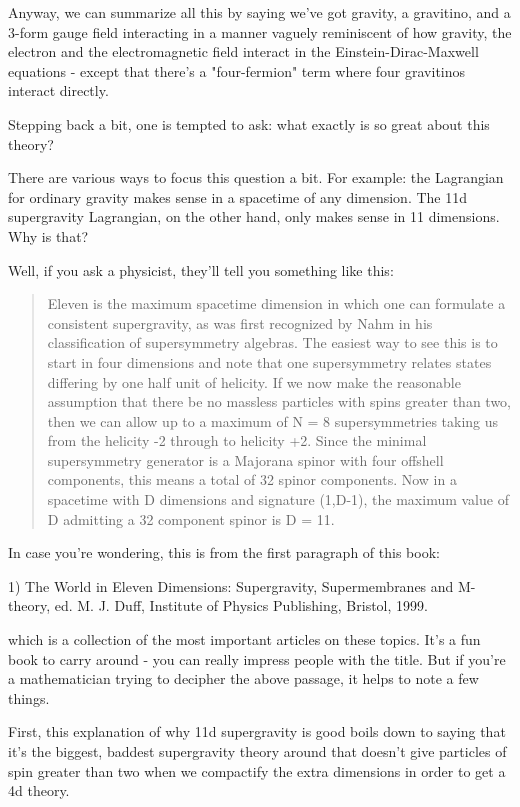 Anyway, we can summarize all this by saying we've got gravity, a
gravitino, and a 3-form gauge field interacting in a manner vaguely
reminiscent of how gravity, the electron and the electromagnetic field
interact in the Einstein-Dirac-Maxwell equations - except that there's a
"four-fermion" term where four gravitinos interact directly.

Stepping back a bit, one is tempted to ask: what exactly is so great 
about this theory?   
 
There are various ways to focus this question a bit.  For example: the 
Lagrangian for ordinary gravity makes sense in a spacetime of any 
dimension.  The 11d supergravity Lagrangian, on the other hand, only 
makes sense in 11 dimensions.   Why is that?   
 
Well, if you ask a physicist, they'll tell you something like this: 
 
\begin{quote}
    Eleven is the maximum spacetime dimension in which one can formulate 
    a consistent supergravity, as was first recognized by Nahm in his 
    classification of supersymmetry algebras.  The easiest way to see this 
    is to start in four dimensions and note that one supersymmetry relates 
    states differing by one half unit of helicity.  If we now make the  
    reasonable assumption that there be no massless particles with spins 
    greater than two, then we can allow up to a maximum of N = 8  
    supersymmetries taking us from the helicity -2 through to helicity +2. 
    Since the minimal supersymmetry generator is a Majorana spinor with 
    four offshell components, this means a total of 32 spinor components. 
    Now in a spacetime with D dimensions and signature (1,D-1), the 
    maximum value of D admitting a 32 component spinor is D = 11. 
\end{quote}

In case you're wondering, this is from the first paragraph of this book: 
 
1) The World in Eleven Dimensions: Supergravity, Supermembranes and 
M-theory, ed. M. J. Duff, Institute of Physics Publishing, Bristol, 
1999. 
 
which is a collection of the most important articles on these topics. 
It's a fun book to carry around - you can really impress people with the 
title.  But if you're a mathematician trying to decipher the above 
passage, it helps to note a few things. 
 
First, this explanation of why 11d supergravity is good boils down to 
saying that it's the biggest, baddest supergravity theory around that 
doesn't give particles of spin greater than two when we compactify the 
extra dimensions in order to get a 4d theory.   
 
